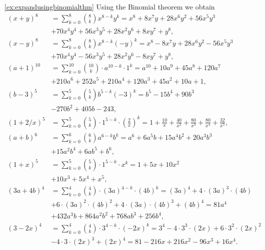\begin{enumerate}
\item[\ref{ex:expandusingbinomialthm}]
Using the Binomial theorem we obtain  
\begin{align*}
(x+y)^8&= \sum_{k=0}^8 \binom{8}{k} x^{8-k} y^k = x^8 + 8 x^7y + 28x^6y^2 + 56 x^5y^3 \\
&+ 70 x^4 y^4 + 56 x^3 y^5 + 28 x^2 y^6 + 8 x y^7 + y^8, \\
(x-y)^8&= \sum_{k=0}^8 \binom{8}{k} x^{8-k} \left( -y \right)^k = x^8 - 8 x^7y + 28x^6y^2 - 56 x^5y^3 \\
&+ 70 x^4 y^4 - 56 x^3 y^5 + 28 x^2 y^6 - 8 x y^7 + y^8, \\
(a+1)^{10} &= \sum_{k=0}^{10} \binom{10}{k} \cdot a^{10-k}\cdot 1^k = a^{10} + 10a^9 + 45a^8 + 120a^7 \\
&+ 210a^6 + 252a^5 + 210a^4 + 120 a^3 + 45 a^2 + 10a + 1, \\
(b-3)^5 &= \sum_{k=0}^5 \binom{5}{k} b^{5-k} \left( -3 \right)^k = b^5 -15 b^4 + 90 b^3 \\
&-270 b^2 + 405 b - 243, \\
(1 + 2/x)^5 &= \sum_{k=0}^5 \binom{5}{k} \cdot 1^{5-k} \cdot \left( \frac{2}{x} \right)^k = 1 + \frac{10}{x} + \frac{40}{x^2} + \frac{80}{x^3} + \frac{80}{x^4} + \frac{32}{x^5}, \\
\left( a + b \right)^6 &= \sum_{k=0}^6 \binom{6}{k} a^{6-k} b^k = a^6 + 6a^5b + 15 a^4 b^2 + 20 a^3 b^3 \\
&+ 15 a^2 b^4 + 6ab^5 + b^6, \\
\left( 1 + x \right)^5 &= \sum_{k=0}^5 \binom{5}{k} \cdot 1^{5-k} \cdot x^k = 1 + 5x + 10x^2 \\
&+ 10x^3 + 5x^4 + x^5, \\
\left(3a + 4b \right)^4 &= \sum_{k=0}^4 \binom{4}{k} \cdot \left(3a\right)^{4-k} \cdot \left(4b\right)^k = \left( 3a \right)^4 + 4 \cdot \left( 3a \right)^3 \cdot \left( 4b \right) \\
&+ 6 \cdot \left( 3a \right)^2 \cdot \left( 4b \right)^2 + 4 \cdot \left( 3a \right) \cdot \left( 4b \right)^3 + \left( 4b \right)^4  = 81 a^4 \\
&+ 432 a^3b + 864 a^2b^2 + 768 ab^3 + 256 b^4, \\
\left( 3 - 2x \right)^4 &= \sum_{k=0}^4 \binom{4}{k} \cdot 3^{4-k} \cdot \left(-2x\right)^k = 3^4 - 4 \cdot 3^3 \cdot \left( 2x \right) + 6 \cdot 3^2 \cdot \left( 2x \right)^2 \\
&- 4 \cdot 3 \cdot \left( 2x \right)^3 + \left( 2x \right)^4  = 81 - 216 x + 216 x^2 - 96 x^3 + 16 x^4.
\end{align*}


\end{enumerate}
